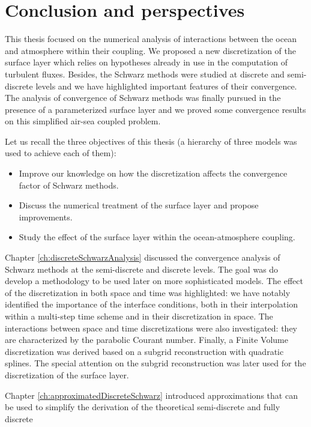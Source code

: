\chapter*{Conclusion and perspectives}
\label{ch:conclusion}
This thesis focused on the numerical analysis of interactions between
the ocean and atmosphere within their coupling. We proposed a
new discretization of the surface layer which relies on
hypotheses already in use in the computation of turbulent fluxes.
Besides, the Schwarz methods were studied at discrete and
semi-discrete levels and we have highlighted important features
of their convergence. The analysis of convergence of Schwarz methods
was finally pursued
in the presence of a parameterized surface layer and we
proved some convergence results on this simplified air-sea coupled
problem.
\par
Let us recall the three objectives of this thesis (a hierarchy
of three models was used to achieve each of them):
\begin{itemize}
\item Improve our knowledge on how the discretization affects
the convergence factor of Schwarz methods.
\item Discuss the numerical treatment of the surface layer
	and propose improvements.
\item Study the effect of the surface layer within
	the ocean-atmosphere coupling.
\end{itemize}
\par
Chapter \ref{ch:discreteSchwarzAnalysis} discussed the convergence
analysis of Schwarz methods at the semi-discrete and discrete
levels.
The goal was do develop a methodology to be used later
on more sophisticated models.
The effect of the discretization in both
space and time was highlighted: we have notably identified
the importance of the interface conditions,
both in their interpolation within a multi-step time scheme
and in their discretization in space.
The interactions between space and time discretizations
were also investigated: they are characterized by the
parabolic Courant number.
Finally, a Finite Volume discretization was derived based
on a subgrid reconstruction with quadratic splines.
The special attention on the subgrid reconstruction
was later used for the discretization of the surface layer.
\par
Chapter \ref{ch:approximatedDiscreteSchwarz} introduced
approximations that can be used to simplify the derivation
of the theoretical semi-discrete and fully discrete
